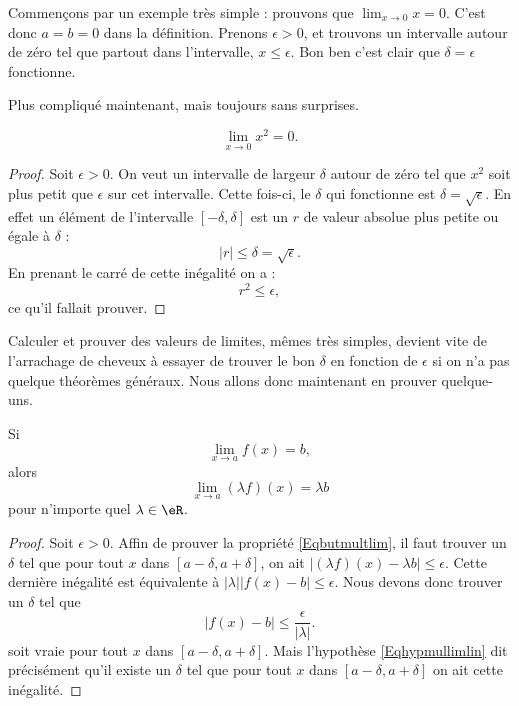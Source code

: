 Commençons par un exemple très simple : prouvons que $\lim_{x\to 0}x=0$. C'est donc $a=b=0$ dans la définition. Prenons $\epsilon>0$, et trouvons un intervalle autour de zéro tel que partout dans l'intervalle, $x\leq \epsilon$. Bon ben c'est clair que $\delta=\epsilon$ fonctionne.

Plus compliqué maintenant, mais toujours sans surprises.

\begin{proposition}
\[ 
  \lim_{x\to 0}x^2=0.
\]

\end{proposition}

\begin{proof}
Soit $\epsilon>0$. On veut un intervalle de largeur $\delta$ autour de zéro tel que $x^2$ soit plus petit que $\epsilon$ sur cet intervalle. Cette fois-ci, le $\delta$ qui fonctionne est $\delta=\sqrt{\epsilon}$. En effet un élément de l'intervalle $[-\delta,\delta]$ est un $r$ de valeur absolue plus petite ou égale à $\delta$ : 
\[ 
| r |\leq\delta=\sqrt{\epsilon}.
\]
En prenant le carré de cette inégalité on a :
\[ 
  r^2\leq\epsilon,
\]
ce qu'il fallait prouver.
\end{proof}


Calculer et prouver des valeurs de limites, mêmes très simples, devient vite de l'arrachage de cheveux à essayer de trouver le bon $\delta$ en fonction de $\epsilon$ si on n'a pas quelque théorèmes généraux. Nous allons donc maintenant en prouver quelque-uns.

\begin{theorem}     \label{ThoLimLinMul}
    Si
    \begin{equation} \label{Eqhypmullimlin}
      \lim_{x\to a}f(x)=b,
    \end{equation}
    alors
    \begin{equation} \label{Eqbutmultlim}
      \lim_{x\to a}(\lambda f)(x)=\lambda b
    \end{equation}
    pour n'importe quel $\lambda\in\eR$.
\end{theorem}

\begin{proof}
Soit $\epsilon>0$. Affin de prouver la propriété \eqref{Eqbutmultlim}, il faut trouver un $\delta$ tel que pour tout $x$ dans $[a-\delta,a+\delta]$, on ait $| (\lambda f)(x)- \lambda b |\leq\epsilon$. Cette dernière inégalité est équivalente à $|\lambda|| f(x)-b |\leq\epsilon$. Nous devons donc trouver un $\delta$ tel que 
\begin{equation} 
| f(x)-b |\leq\frac{ \epsilon }{ | \lambda | }.
\end{equation}
soit vraie pour tout $x$ dans $[a-\delta,a+\delta]$. Mais l'hypothèse \eqref{Eqhypmullimlin} dit précisément qu'il existe un $\delta$ tel que pour tout $x$ dans $[a-\delta,a+\delta]$ on ait cette inégalité. 
\end{proof}

